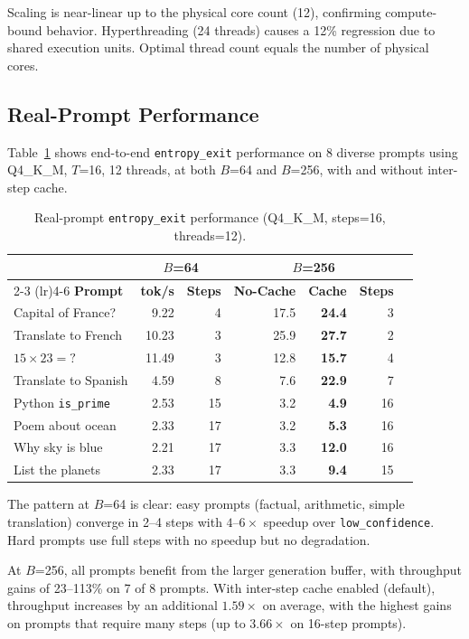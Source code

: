 \documentclass[11pt]{article}
\begin{document}
Scaling is near-linear up to the physical core count (12), confirming compute-bound
behavior. Hyperthreading (24 threads) causes a 12\% regression due to shared execution
units. Optimal thread count equals the number of physical cores.

\subsection{Real-Prompt Performance}

Table~\ref{tab:real} shows end-to-end \texttt{entropy\_exit} performance on 8 diverse
prompts using Q4\_K\_M, $T$=16, 12 threads, at both $B$=64 and $B$=256, with and
without inter-step cache.

\begin{table}[h]
\centering
\caption{Real-prompt \texttt{entropy\_exit} performance (Q4\_K\_M, steps=16, threads=12).}
\label{tab:real}
\begin{tabular}{lrrrrrr}
\toprule
 & \multicolumn{2}{c}{$B$=64} & \multicolumn{3}{c}{$B$=256} \\
\cmidrule(lr){2-3} \cmidrule(lr){4-6}
\textbf{Prompt} & \textbf{tok/s} & \textbf{Steps} & \textbf{No-Cache} & \textbf{Cache} & \textbf{Steps} \\
\midrule
Capital of France? & 9.22 & 4 & 17.5 & \textbf{24.4} & 3 \\
Translate to French & 10.23 & 3 & 25.9 & \textbf{27.7} & 2 \\
$15 \times 23 = ?$ & 11.49 & 3 & 12.8 & \textbf{15.7} & 4 \\
Translate to Spanish & 4.59 & 8 & 7.6 & \textbf{22.9} & 7 \\
Python \texttt{is\_prime} & 2.53 & 15 & 3.2 & \textbf{4.9} & 16 \\
Poem about ocean & 2.33 & 17 & 3.2 & \textbf{5.3} & 16 \\
Why sky is blue & 2.21 & 17 & 3.3 & \textbf{12.0} & 16 \\
List the planets & 2.33 & 17 & 3.3 & \textbf{9.4} & 15 \\
\bottomrule
\end{tabular}
\end{table}

The pattern at $B$=64 is clear: easy prompts (factual, arithmetic, simple translation)
converge in 2--4 steps with $4$--$6\times$ speedup over \texttt{low\_confidence}. Hard
prompts use full steps with no speedup but no degradation.

At $B$=256, all prompts benefit from the larger generation buffer, with throughput gains
of 23--113\% on 7 of 8 prompts. With inter-step cache enabled (default), throughput
increases by an additional $1.59\times$ on average, with the highest gains on prompts
that require many steps (up to $3.66\times$ on 16-step prompts).
\end{document}
